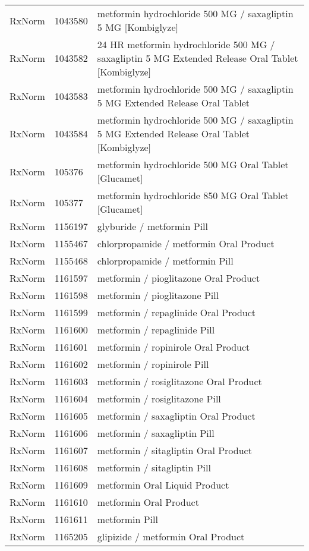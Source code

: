 \begin{longtable}{p{}p{}p{}}
  RxNorm & 1043580 & metformin hydrochloride 500 MG / saxagliptin 5 MG [Kombiglyze] \\ 
  RxNorm & 1043582 & 24 HR metformin hydrochloride 500 MG / saxagliptin 5 MG Extended Release Oral Tablet [Kombiglyze] \\ 
  RxNorm & 1043583 & metformin hydrochloride 500 MG / saxagliptin 5 MG Extended Release Oral Tablet \\ 
  RxNorm & 1043584 & metformin hydrochloride 500 MG / saxagliptin 5 MG Extended Release Oral Tablet [Kombiglyze] \\ 
  RxNorm & 105376 & metformin hydrochloride 500 MG Oral Tablet [Glucamet] \\ 
  RxNorm & 105377 & metformin hydrochloride 850 MG Oral Tablet [Glucamet] \\ 
  RxNorm & 1156197 & glyburide / metformin Pill \\ 
  RxNorm & 1155467 & chlorpropamide / metformin Oral Product \\ 
  RxNorm & 1155468 & chlorpropamide / metformin Pill \\ 
  RxNorm & 1161597 & metformin / pioglitazone Oral Product \\ 
  RxNorm & 1161598 & metformin / pioglitazone Pill \\ 
  RxNorm & 1161599 & metformin / repaglinide Oral Product \\ 
  RxNorm & 1161600 & metformin / repaglinide Pill \\ 
  RxNorm & 1161601 & metformin / ropinirole Oral Product \\ 
  RxNorm & 1161602 & metformin / ropinirole Pill \\ 
  RxNorm & 1161603 & metformin / rosiglitazone Oral Product \\ 
  RxNorm & 1161604 & metformin / rosiglitazone Pill \\ 
  RxNorm & 1161605 & metformin / saxagliptin Oral Product \\ 
  RxNorm & 1161606 & metformin / saxagliptin Pill \\ 
  RxNorm & 1161607 & metformin / sitagliptin Oral Product \\ 
  RxNorm & 1161608 & metformin / sitagliptin Pill \\ 
  RxNorm & 1161609 & metformin Oral Liquid Product \\ 
  RxNorm & 1161610 & metformin Oral Product \\ 
  RxNorm & 1161611 & metformin Pill \\ 
  RxNorm & 1165205 & glipizide / metformin Oral Product \\ 

\end{longtable}
